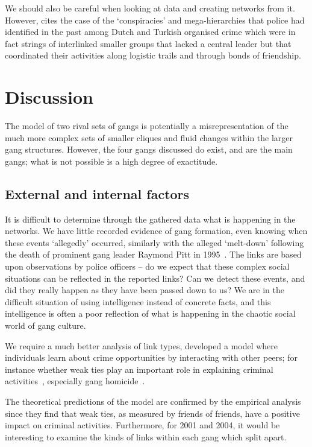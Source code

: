 \documentclass[twocolumn]{svjour3}          %
\theoremstyle{definition}
\begin{document}
We should also be careful when looking at data and creating networks
from it. However, \citet{Klerks2001} cites the case of the
`conspiracies' and mega-hierarchies that police had identified in the
past among Dutch and Turkish organised crime which were in fact
strings of interlinked smaller groups that lacked a central leader but
that coordinated their activities along logistic trails and through
bonds of friendship.

\section{Discussion}\label{sec:discussion}

The model of two rival sets of gangs is potentially a
misrepresentation of the much more complex sets of smaller cliques and
fluid changes within the larger gang structures. However, the four
gangs discussed do exist, and are the main gangs; what is not possible
is a high degree of exactitude.

\subsection{External and internal factors}

It is difficult to determine through the gathered data what is
happening in the networks. We have little recorded evidence of gang
formation, even knowing when these events `allegedly' occurred,
similarly with the alleged `melt-down' following the death of
prominent gang leader Raymond Pitt in 1995~\citep{Walsh2005}. The links
are based upon observations by police officers -- do we expect that
these complex social situations can be reflected in the reported
links? Can we detect these events, and did they really happen as they
have been passed down to us? We are in the difficult situation of
using intelligence instead of concrete facts, and this intelligence is
often a poor reflection of what is happening in the chaotic social
world of gang culture.

We require a much better analysis of link types, developed a model
where individuals learn about crime opportunities by interacting with
other peers; for instance whether weak ties play an important role in
explaining criminal activities~\citep{PatacchiniZenou2008}, especially
gang homicide~\citep{papachristos:2009}.

The theoretical predictions of the model are confirmed by the
empirical analysis since they find that weak ties, as measured by
friends of friends, have a positive impact on criminal
activities. Furthermore, for 2001 and 2004, it would be interesting to
examine the kinds of links within each gang which split apart.
\end{document}
